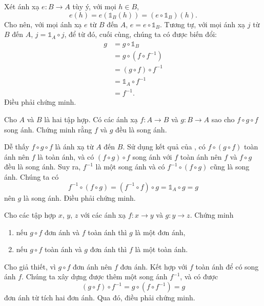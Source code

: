 Xét ánh xạ $e:B \to A$ tùy ý, với mọi $h \in B$, \begin{equation*}
   e(h) = e(\mathds{1}_B(h)) = (e \circ \mathds{1}_B)(h).
\end{equation*} 
Cho nên, với mọi ánh xạ $e$ từ $B$ đến $A$, $e = e \circ \mathds{1}_B$. Tương tự, với mọi ánh xạ $j$ từ $B$ đến $A$, $j = \mathds{1}_A \circ j$, để từ đó, cuối cùng, chúng ta có được biến đổi:
\begin{align*}
   g &= g \circ \mathds{1}_B \\
      &= g \circ (f \circ f^{-1}) \\
      &= (g \circ f) \circ f^{-1} \\
      &= \mathds{1}_A \circ f^{-1} \\
      &= f^{-1}.
\end{align*}
Điều phải chứng minh.

\exercise Cho $A$ và $B$ là hai tập hợp. Có các ánh xạ $f: A \to B$ và $g: B \to A$ sao cho $f \circ g \circ f$ song ánh. Chứng minh rằng $f$ và $g$ đều là song ánh.

\solution

Dễ thấy $f \circ g \circ f$ là ánh xạ từ $A$ đến $B$. Sử dụng kết quả của , có $f \circ (g \circ f)$ toàn ánh nên $f$ là toàn ánh, và có $(f \circ g) \circ f$ song ánh với $f$ toàn ánh nên $f$ và $f \circ g$ đều là song ánh. Suy ra, $f^{-1}$ là một song ánh và có $f^{-1} \circ (f \circ g)$ cũng là song ánh. Chúng ta có \begin{equation*}
   f^{-1} \circ (f \circ g) = (f^{-1} \circ f) \circ g = \mathds{1}_A \circ g = g
\end{equation*}
nên $g$ là song ánh. Điều phải chứng minh.

\exercise Cho các tập hợp $x$, $y$, $z$ với các ánh xạ $f: x \to y$ và $g: y \to z$. Chứng minh
\begin{enumerate}
   \item nếu $g \circ f$ đơn ánh và $f$ toàn ánh thì $g$ là một đơn ánh,
   \item nếu $g \circ f$ toàn ánh và $g$ đơn ánh thì $f$ là một toàn ánh.
\end{enumerate}

\solution

\resetSubexercise Cho giả thiết, vì $g \circ f$ đơn ánh nên $f$ đơn ánh. Kết hợp với $f$ toàn ánh để có song ánh $f$. Chúng ta xây dựng được thêm một song ánh $f^{-1}$, và có được $$(g \circ f) \circ f^{-1} = g \circ (f \circ f^{-1}) = g$$ đơn ánh từ tích hai đơn ánh. Qua đó, điều phải chứng minh.

